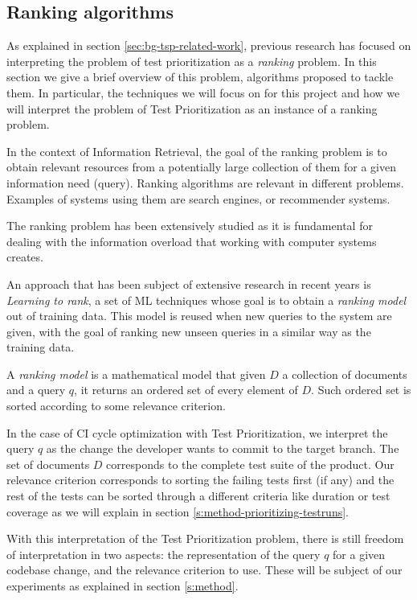 \subsection{Ranking algorithms}

As explained in section \ref{sec:bg-tsp-related-work}, previous research has 
focused on interpreting the problem of test prioritization as a \emph{ranking} 
problem. In this section we give a brief overview of this problem, algorithms proposed
to tackle them. In particular, the techniques we will focus on for this project
and how we will interpret the problem of Test Prioritization as an instance
of a ranking problem.

In the context of Information Retrieval, the goal of the ranking problem is to obtain relevant resources
from a potentially large collection of them for a given information need (query). 
Ranking algorithms are relevant in different problems. Examples of systems using them are search engines, or 
recommender systems.

The ranking problem has been extensively studied as it is fundamental for dealing with the
information overload that working with computer systems creates.

An approach that has been subject of extensive research in recent years is \emph{Learning to rank},
a set of ML techniques whose goal is to obtain a \emph{ranking model} out of
training data. This model is reused when new queries to the system are given,
with the goal of ranking new unseen queries in a similar way as the training data.

A \emph{ranking model} is a mathematical model that given $D$ a collection of documents
and a query $q$, it returns an ordered set of every element of $D$. Such ordered set is
sorted according to some relevance criterion.

In the case of CI cycle optimization with Test Prioritization, we interpret the query $q$ as the
change the developer wants to commit to the target branch. The set of documents $D$ corresponds to
the complete test suite of the product. Our relevance criterion corresponds to sorting the
failing tests first (if any) and the rest of the tests can be sorted through a different criteria
like duration or test coverage as we will explain in section \ref{s:method-prioritizing-testruns}.

With this interpretation of the Test Prioritization problem, there is still freedom 
of interpretation in two aspects: the representation of the query $q$ for a given codebase change, and the 
relevance criterion to use. These will be subject of our experiments as explained in section \ref{s:method}.

